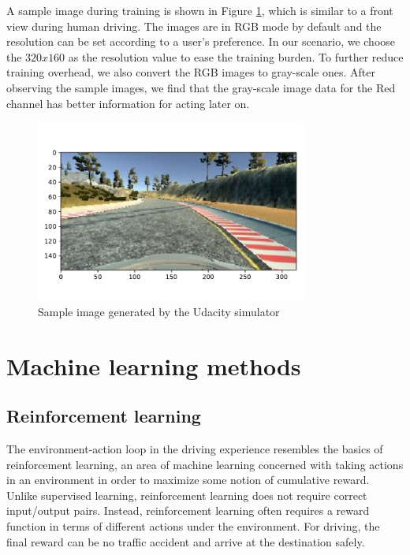 \documentclass[a4paper]{article}
\begin{document}
A sample image during training is shown in Figure \ref{fig:sample_rgb}, which is similar to a front 
view during human driving. The images are in RGB mode by default and the resolution can be set according
to a user's preference. In our scenario, we choose the $320 x 160$ as the resolution value to ease
the training burden. To further reduce training overhead, we 
also convert the RGB images to gray-scale ones. After observing the sample images, we find that
the gray-scale image data for the Red channel has better information for acting later on. 

\begin{figure}
    \centering
    \includegraphics[width=0.8\textwidth]{./figures/sample_rgb.pdf}
    \caption{ Sample image generated by the Udacity simulator }
    \label{fig:sample_rgb}
\end{figure}


\section{Machine learning methods}

\subsection{Reinforcement learning}
The environment-action loop in the driving experience resembles the basics of reinforcement
learning, an area of machine learning concerned with taking actions in an environment in order to
maximize some notion of cumulative reward. Unlike supervised learning, reinforcement learning
does not require correct input/output pairs. Instead, reinforcement learning often requires a
reward function in terms of different actions under the environment. For driving, the final
reward can be no traffic accident and arrive at the destination safely.
\end{document}
